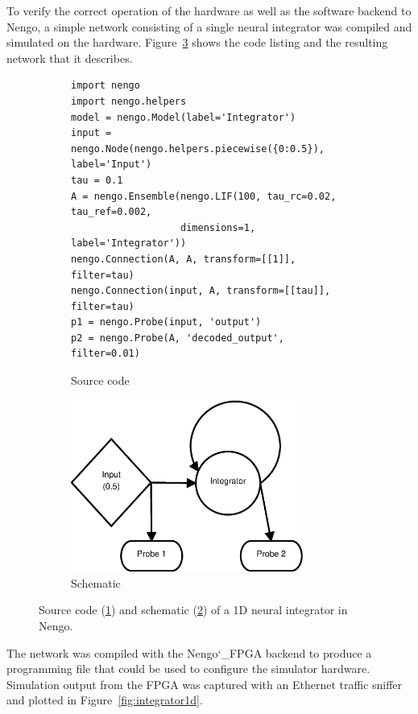 \documentclass[english]{article}
\newcommand{\design}{Nengo\char`_FPGA}  %
\begin{document}
To verify the correct operation of the hardware as well as the software backend to Nengo, a simple network consisting of a single neural integrator was compiled and simulated on the hardware.
Figure~\ref{lst:integrator1d} shows the code listing and the resulting network that it describes.
\begin{figure}
\centering

\begin{subfigure}[b]{\textwidth}
\centering
\lstset{language=Python}
\begin{lstlisting}[frame=single]
import nengo
import nengo.helpers
model = nengo.Model(label='Integrator')
input = nengo.Node(nengo.helpers.piecewise({0:0.5}), label='Input')
tau = 0.1
A = nengo.Ensemble(nengo.LIF(100, tau_rc=0.02, tau_ref=0.002,
                   dimensions=1, label='Integrator'))
nengo.Connection(A, A, transform=[[1]], filter=tau)
nengo.Connection(input, A, transform=[[tau]], filter=tau)
p1 = nengo.Probe(input, 'output')
p2 = nengo.Probe(A, 'decoded_output', filter=0.01)
\end{lstlisting}
\caption{Source code}
\label{lst:integrator1d:code}
\end{subfigure}

\begin{subfigure}[b]{0.3\textwidth}
\centering
\includegraphics[width=3.0in]{integrator-1d-schematic.eps}
\caption{Schematic}
\label{lst:integrator1d:schematic}
\end{subfigure}

\caption[A 1D neural integrator in Nengo.]
{Source code (\ref{lst:integrator1d:code}) and schematic (\ref{lst:integrator1d:schematic}) of a 1D neural integrator in Nengo.}
\label{lst:integrator1d}
\end{figure}

The network was compiled with the \design{} backend to produce a programming file that could be used to configure the simulator hardware.
Simulation output from the FPGA was captured with an Ethernet traffic sniffer and plotted in Figure~\ref{fig:integrator1d}.
\end{document}
